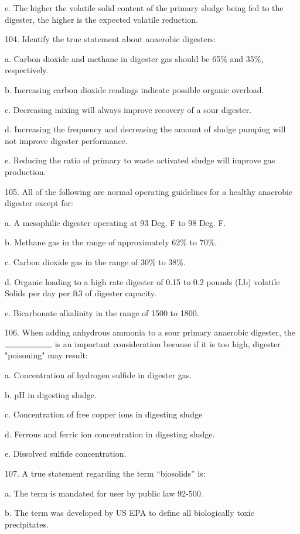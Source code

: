 \documentclass{article}
\begin{document}
e. The higher the volatile solid content of the primary sludge being fed to the digester, the higher is the expected volatile reduction. 


104. Identify the true statement about anaerobic digesters: 

a. Carbon dioxide and methane in digester gas should be 65\% and 35\%, respectively. 

b. Increasing carbon dioxide readings indicate possible organic overload. 

c. Decreasing mixing will always improve recovery of a sour digester. 

d. Increasing the frequency and decreasing the amount of sludge pumping will not improve digester performance. 

e. Reducing the ratio of primary to waste activated sludge will improve gas production. 


105. All of the following are normal operating guidelines for a healthy anaerobic digester except for: 

a. A mesophilic digester operating at 93 Deg. F to 98 Deg. F. 

b. Methane gas in the range of approximately 62\% to 70\%. 

c. Carbon dioxide gas in the range of 30\% to 38\%. 

d. Organic loading to a high rate digester of 0.15 to 0.2 pounds (Lb) volatile Solids per day per ft3 of digester capacity. 

e. Bicarbonate alkalinity in the range of 1500 to 1800. 


106. When adding anhydrous ammonia to a sour primary anaerobic digester, the $\rule{2cm}{0.15mm}$ is an important consideration because if it is too high, digester "poisoning" may result: 

a. Concentration of hydrogen sulfide in digester gas. 

b. pH in digesting sludge. 

c. Concentration of free copper ions in digesting sludge 

d. Ferrous and ferric ion concentration in digesting sludge. 

e. Dissolved sulfide concentration. 


107. A true statement regarding the term “biosolids” is: 

a. The term is mandated for user by public law 92-500. 

b. The term was developed by US EPA to define all biologically toxic precipitates. 
\end{document}

